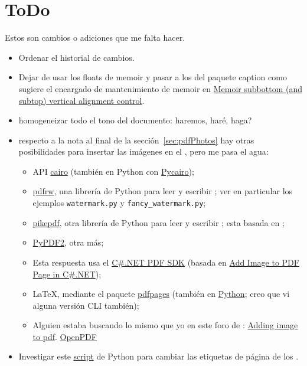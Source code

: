 \documentclass[%
	a5paper,
	10pt,
	twoside,
	openright,
	final,
]{memoir}
\begin{document}
{\chapter{ToDo} Estos son cambios o adiciones que me falta hacer.
\begin{itemize}
	\item Ordenar el historial de cambios.
	\item Dejar de usar los floats de memoir y pasar a los del paquete caption como sugiere el encargado de mantenimiento de memoir en \href{https://tex.stackexchange.com/questions/524747/memoir-subbottom-and-subtop-vertical-alignment-control}{Memoir subbottom (and subtop) vertical alignment control}.
	\item homogeneizar todo el tono del documento: haremos, haré, haga?
	\item respecto a la nota al final de la sección~\ref{sec:pdfPhotos} hay otras posibilidades para insertar las imágenes en el \pdf, pero me pasa el agua:
		\begin{itemize}[noitemsep]
			\item API \href{cairographics.org}{cairo} (también en Python con \href{https://www.cairographics.org/pycairo/}{Pycairo});
			\item \href{https://github.com/pmaupin/pdfrw}{pdfrw}, una librería de Python para leer y escribir \pdf; ver en particular los ejemplos \texttt{watermark.py} y \texttt{fancy\_watermark.py};
			\item \href{https://github.com/pikepdf/pikepdf}{pikepdf}, otra librería de Python para leer y escribir \pdf; esta basada en \qpdf;
			\item \href{https://github.com/mstamy2/PyPDF2}{PyPDF2}, otra más;
			\item Esta respuesta usa el \href{https://askubuntu.com/a/334463}{C\#.NET PDF SDK} (basada en \href{http://www.rasteredge.com/how-to/csharp-imaging/pdf-add-image/}{Add Image to PDF Page in C\#.NET});
			\item \LaTeX, mediante el paquete \href{https://www.ctan.org/pkg/pdfpages}{pdfpages} (también en \href{https://pypi.org/project/pdfpages/}{Python}; creo que vi alguna versión CLI también);
			\item Alguien estaba buscando lo mismo que yo en este foro de \imagemagick: \href{https://www.imagemagick.org/discourse-server/viewtopic.php?t=31103}{Adding image to pdf}.
			\href{https://github.com/LibrePDF/OpenPDF/}{OpenPDF}
		\end{itemize}
	\item Investigar este \href{https://github.com/lovasoa/pagelabels-py}{script} de Python para cambiar las etiquetas de página de los \pdf.

\end{itemize}}
\end{document}
